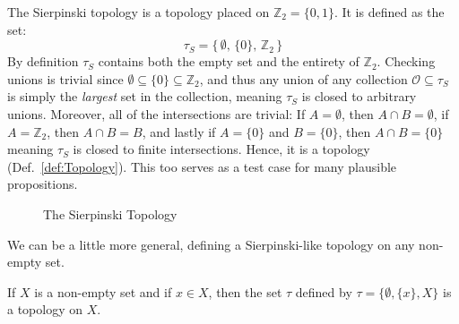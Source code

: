     \begin{example}
        The Sierpinski topology is a topology placed
        on $\mathbb{Z}_{2}=\{0,1\}$. It is defined as the set:
        \begin{equation}
            \tau_{S}=\{\,\emptyset,\,\{0\},\,\mathbb{Z}_{2}\,\}
        \end{equation}
        By definition $\tau_{S}$ contains both the empty set and the entirety of
        $\mathbb{Z}_{2}$. Checking unions is trivial since
        $\emptyset\subseteq\{0\}\subseteq\mathbb{Z}_{2}$, and thus any union of
        any collection $\mathcal{O}\subseteq\tau_{S}$ is simply the
        \textit{largest} set in the collection, meaning $\tau_{S}$ is closed to
        arbitrary unions. Moreover, all of the intersections are trivial:
        If $A=\emptyset$, then $A\cap{B}=\emptyset$, if $A=\mathbb{Z}_{2}$, then
        $A\cap{B}=B$, and lastly if $A=\{0\}$ and $B=\{0\}$, then
        $A\cap{B}=\{0\}$ meaning $\tau_{S}$ is closed to finite intersections.
        Hence, it is a topology (Def.~\ref{def:Topology}). This too serves as a
        test case for many plausible propositions.
    \end{example}
    \begin{figure}[H]
        \centering
        \captionsetup{type=figure}
        \caption{The Sierpinski Topology}
        \label{fig:Sierpinksi_Topology}
    \end{figure}
    We can be a little more general, defining a Sierpinski-like topology on any
    non-empty set.
    \begin{theorem}
        \label{thm:Existence_of_Sierpinski_Like_Topology}%
        If $X$ is a non-empty set and if $x\in{X}$, then the set $\tau$ defined
        by $\tau=\{\emptyset,\{x\},X\}$ is a topology on $X$.
    \end{theorem}
